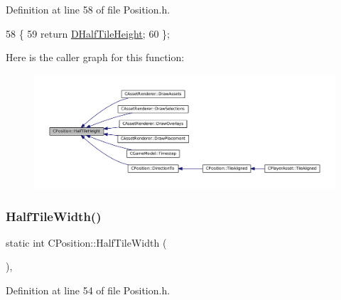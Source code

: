 Definition at line 58 of file Position.\+h.


\begin{DoxyCode}
58                                    \{
59             \textcolor{keywordflow}{return} \hyperlink{classCPosition_a1e0af68f7690b3cfc14687cf7fbe7ade}{DHalfTileHeight};  
60         \};
\end{DoxyCode}
Here is the caller graph for this function\+:\nopagebreak
\begin{figure}[H]
\begin{center}
\leavevmode
\includegraphics[width=350pt]{classCPosition_a5e371060b1aa0d3d3c5df1e353e0e5fd_icgraph}
\end{center}
\end{figure}
\hypertarget{classCPosition_a4b799a0fb78ddd8bbd8548980e2458af}{}\label{classCPosition_a4b799a0fb78ddd8bbd8548980e2458af} 
\subsubsection{\texorpdfstring{Half\+Tile\+Width()}{HalfTileWidth()}}
{\footnotesize\ttfamily static int C\+Position\+::\+Half\+Tile\+Width (\begin{DoxyParamCaption}{ }\end{DoxyParamCaption})\hspace{0.3cm}{\ttfamily [inline]}, {\ttfamily [static]}}



Definition at line 54 of file Position.\+h.


